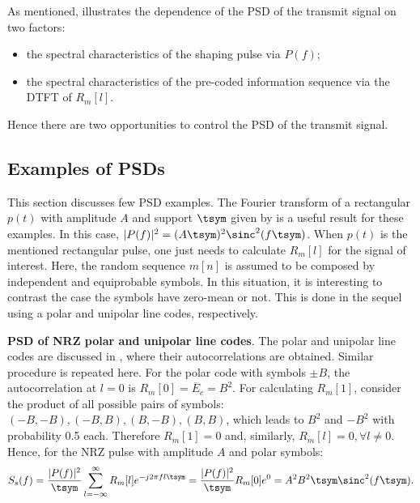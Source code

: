 
As mentioned,  illustrates the dependence of the PSD of the transmit signal on two factors:
\begin{itemize}
	\item the spectral characteristics of the shaping pulse via $P(f)$;
	\item the spectral characteristics of the pre-coded information sequence via the DTFT of $R_m[l]$.
\end{itemize}
Hence there are two opportunities to control the PSD of the transmit signal.

\subsection{Examples of PSDs}

This section discusses few PSD examples. The Fourier transform of a rectangular $p(t)$ with amplitude $A$ and support $\tsym$ given by  is a useful result for these examples. In this case, $|P(f)|^2 = (A \tsym)^2 \sinc^2(f \tsym)$.
When $p(t)$ is the mentioned rectangular pulse, one just needs to calculate $R_m[l]$ for the signal of interest. Here, the random sequence $m[n]$ is assumed to be composed by independent and equiprobable symbols. In this situation, it is interesting to contrast the case the symbols
have zero-mean or not. This is done in the sequel using a polar and unipolar line codes, respectively.

\bExample \textbf{PSD of NRZ polar and unipolar line codes}.
\label{ex:psdsNRZs}
The polar and unipolar line codes are discussed in , where their
autocorrelations are obtained. Similar procedure is repeated here.
For the polar code with symbols $\pm B$, the autocorrelation at $l=0$ is $R_m[0]=\overline E_c = B^2$.  For calculating $R_m[1]$, consider the product of all possible pairs of symbols: $(-B,-B),(-B,B),(B,-B),(B,B)$, which leads to $B^2$ and $-B^2$ with probability 0.5 each. Therefore $R_m[1]=0$ and, similarly, $R_m[l]=0, \forall l \ne 0$. Hence, for the NRZ pulse with amplitude $A$ and polar symbols:
\begin{equation}
S_s(f) = \frac{|P(f)|^2}{\tsym} \sum_{l=-\infty}^{\infty} R_m[l] e^{-j 2 \pi f l \tsym} = \frac{|P(f)|^2}{\tsym} R_m[0] e^{0} = A^2 B^2 \tsym \sinc^2(f \tsym).
\label{eq:polarPSD}
\end{equation}


